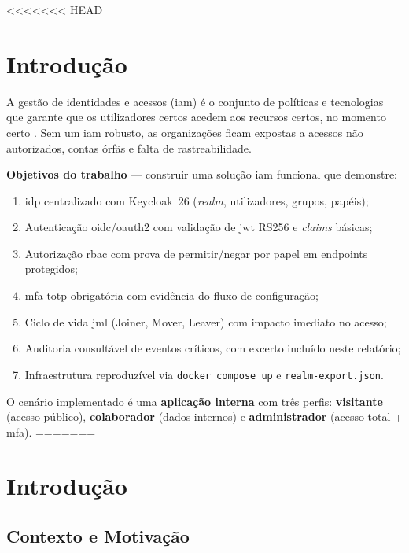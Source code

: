 <<<<<<< HEAD
\chapter{Introdução}
\label{chap:introducao}

A gestão de identidades e acessos (\gls{iam}) é o conjunto de políticas e tecnologias que garante que os utilizadores certos acedem aos recursos certos, no momento certo \cite{NIST80063B}. Sem um \gls{iam} robusto, as organizações ficam expostas a acessos não autorizados, contas órfãs e falta de rastreabilidade.

\textbf{Objetivos do trabalho} — construir uma solução \gls{iam} funcional que demonstre:
\begin{enumerate}
  \item \gls{idp} centralizado com Keycloak~26 (\textit{realm}, utilizadores, grupos, papéis);
  \item Autenticação \gls{oidc}/\gls{oauth2} com validação de \gls{jwt} RS256 e \textit{claims} básicas;
  \item Autorização \gls{rbac} com prova de permitir/negar por papel em endpoints protegidos;
  \item \gls{mfa} \gls{totp} obrigatória com evidência do fluxo de configuração;
  \item Ciclo de vida \gls{jml} (Joiner, Mover, Leaver) com impacto imediato no acesso;
  \item Auditoria consultável de eventos críticos, com excerto incluído neste relatório;
  \item Infraestrutura reproduzível via \texttt{docker compose up} e \texttt{realm-export.json}.
\end{enumerate}

O cenário implementado é uma \textbf{aplicação interna} com três perfis: \textbf{visitante} (acesso público), \textbf{colaborador} (dados internos) e \textbf{administrador} (acesso total + \gls{mfa}).
=======
\chapter{Introdução}
\label{chap:introducao}

\section{Contexto e Motivação}

